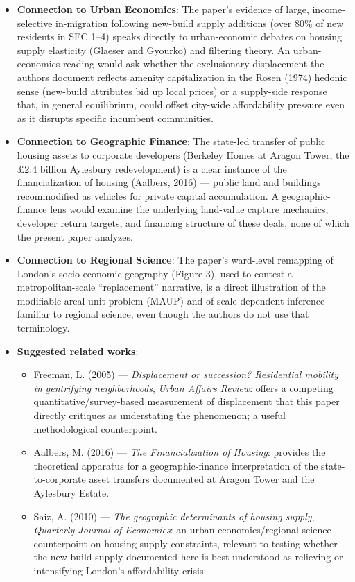 \begin{itemize}
  \item \textbf{Connection to Urban Economics}: The paper's evidence of large, income-selective in-migration following new-build supply additions (over 80\% of new residents in SEC 1--4) speaks directly to urban-economic debates on housing supply elasticity (Glaeser and Gyourko) and filtering theory. An urban-economics reading would ask whether the exclusionary displacement the authors document reflects amenity capitalization in the Rosen (1974) hedonic sense (new-build attributes bid up local prices) or a supply-side response that, in general equilibrium, could offset city-wide affordability pressure even as it disrupts specific incumbent communities.
  \item \textbf{Connection to Geographic Finance}: The state-led transfer of public housing assets to corporate developers (Berkeley Homes at Aragon Tower; the \pounds2.4 billion Aylesbury redevelopment) is a clear instance of the financialization of housing (Aalbers, 2016) --- public land and buildings recommodified as vehicles for private capital accumulation. A geographic-finance lens would examine the underlying land-value capture mechanics, developer return targets, and financing structure of these deals, none of which the present paper analyzes.
  \item \textbf{Connection to Regional Science}: The paper's ward-level remapping of London's socio-economic geography (Figure 3), used to contest a metropolitan-scale ``replacement'' narrative, is a direct illustration of the modifiable areal unit problem (MAUP) and of scale-dependent inference familiar to regional science, even though the authors do not use that terminology.
  \item \textbf{Suggested related works}:
    \begin{itemize}
      \item Freeman, L. (2005) --- \textit{Displacement or succession? Residential mobility in gentrifying neighborhoods}, \textit{Urban Affairs Review}: offers a competing quantitative/survey-based measurement of displacement that this paper directly critiques as understating the phenomenon; a useful methodological counterpoint.
      \item Aalbers, M. (2016) --- \textit{The Financialization of Housing}: provides the theoretical apparatus for a geographic-finance interpretation of the state-to-corporate asset transfers documented at Aragon Tower and the Aylesbury Estate.
      \item Saiz, A. (2010) --- \textit{The geographic determinants of housing supply}, \textit{Quarterly Journal of Economics}: an urban-economics/regional-science counterpoint on housing supply constraints, relevant to testing whether the new-build supply documented here is best understood as relieving or intensifying London's affordability crisis.

\end{itemize}
\end{itemize}
